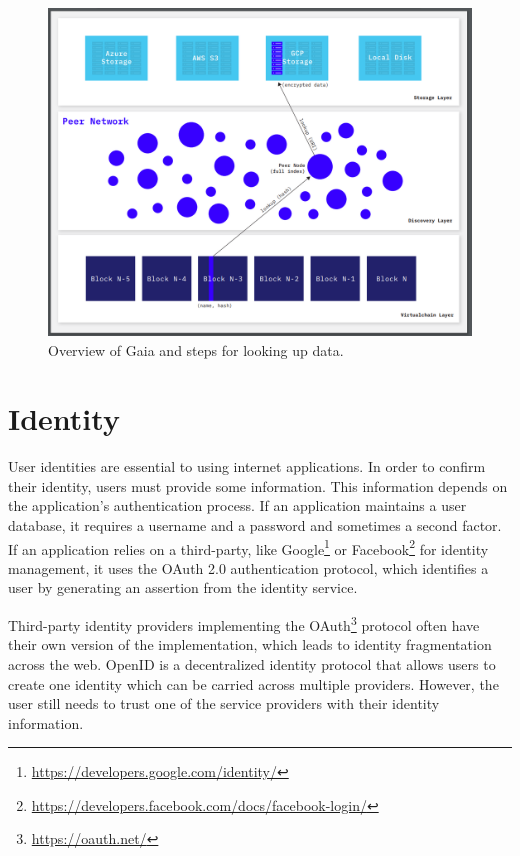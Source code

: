 		\begin{figure}[h]
			\includegraphics[width=\linewidth]{figures/gaia-overview}
			\caption{\label{fig:gaia-overview} Overview of Gaia and steps for looking up data.\protect\footnotemark}
		\end{figure}
		
\cleardoublepage
\section{Identity}
	User identities are essential to using internet applications. In order to confirm their identity, users must provide some information. This information depends on the application's authentication process. If an application maintains a user database, it requires a username and a password and sometimes a second factor. If an application relies on a third-party, like Google\footnote{\url{https://developers.google.com/identity/}} or Facebook\footnote{\url{https://developers.facebook.com/docs/facebook-login/}} for identity management, it uses the OAuth 2.0 authentication\cite{hardt2012oauth} protocol, which identifies a user by generating an assertion from the identity service.
	
	Third-party identity providers implementing the OAuth\footnote{\url{https://oauth.net/}} protocol often have their own version of the implementation, which leads to identity fragmentation across the web. OpenID\cite{recordon2006openid} is a decentralized identity protocol that allows users to create one identity which can be carried across multiple providers. However, the user still needs to trust one of the service providers with their identity information\cite{raval2016decentralized}.
	
